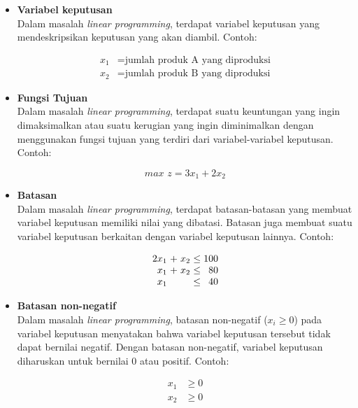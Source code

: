 \begin{itemize}
	\item \textbf{Variabel keputusan}\\
		Dalam masalah \textit{linear programming}, terdapat variabel keputusan yang mendeskripsikan keputusan yang akan diambil. Contoh:
		
		\begin{equation}
			\begin{split}
				x_1 &= \text{jumlah produk A yang diproduksi} \\
    			x_2 &= \text{jumlah produk B yang diproduksi}
			\end{split}
		\end{equation}
		
	\item \textbf{Fungsi Tujuan}\\
		Dalam masalah \textit{linear programming}, terdapat suatu keuntungan yang ingin dimaksimalkan atau suatu kerugian yang ingin diminimalkan dengan menggunakan  fungsi tujuan yang terdiri dari variabel-variabel keputusan. Contoh:
		
		\begin{equation}
			\textit{max } z = 3x_1 + 2x_2
		\end{equation}

	\item \textbf{Batasan}\\
		Dalam masalah \textit{linear programming}, terdapat batasan-batasan yang membuat variabel keputusan memiliki nilai yang dibatasi. Batasan juga membuat suatu variabel keputusan berkaitan dengan variabel keputusan lainnya. Contoh:
		
		\begin{equation}		
			\setlength\arraycolsep{1.5pt}
			\begin{array}{r c r c r}
				2x_1 & + & x_2 & \leq & 100 \\
    			x_1 & + & x_2 & \leq & 80 \\
    			x_1 & & & \leq & 40
			\end{array}
		\end{equation}
		
	\item \textbf{Batasan non-negatif}\\
		Dalam masalah \textit{linear programming}, batasan non-negatif (\(x_i\geq 0\)) pada variabel keputusan menyatakan bahwa variabel keputusan tersebut tidak dapat bernilai negatif. Dengan batasan non-negatif, variabel keputusan diharuskan untuk bernilai 0 atau positif. Contoh:
		
		\begin{equation}
			\begin{split}
    			x_1 &\geq 0 \\
    			x_2 &\geq 0
			\end{split}
		\end{equation}
		
\end{itemize}

